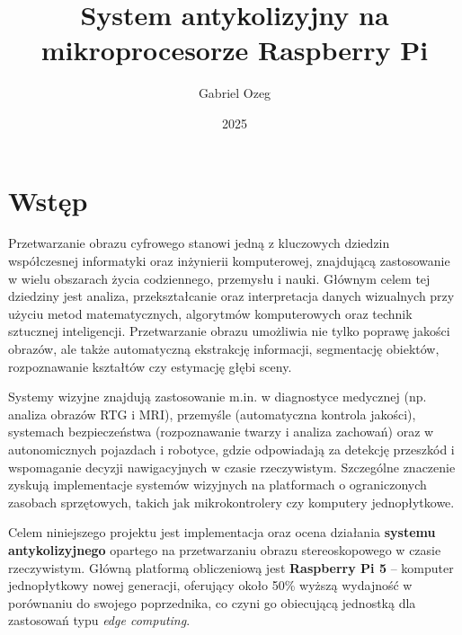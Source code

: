 \documentclass[magisterska]{pracadypl}
\author{Gabriel Ozeg}
\title{System antykolizyjny na mikroprocesorze Raspberry Pi}
\date{2025}
\begin{document}

\maketitle
\tableofcontents
\newpage

\chapter{Wstęp}

Przetwarzanie obrazu cyfrowego stanowi jedną z kluczowych dziedzin współczesnej informatyki oraz inżynierii komputerowej, znajdującą zastosowanie w wielu obszarach życia codziennego, przemysłu i nauki. Głównym celem tej dziedziny jest analiza, przekształcanie oraz interpretacja danych wizualnych przy użyciu metod matematycznych, algorytmów komputerowych oraz technik sztucznej inteligencji. Przetwarzanie obrazu umożliwia nie tylko poprawę jakości obrazów, ale także automatyczną ekstrakcję informacji, segmentację obiektów, rozpoznawanie kształtów czy estymację głębi sceny.

Systemy wizyjne znajdują zastosowanie m.in. w diagnostyce medycznej (np. analiza obrazów RTG i MRI), przemyśle (automatyczna kontrola jakości), systemach bezpieczeństwa (rozpoznawanie twarzy i analiza zachowań) oraz w autonomicznych pojazdach i robotyce, gdzie odpowiadają za detekcję przeszkód i wspomaganie decyzji nawigacyjnych w czasie rzeczywistym. Szczególne znaczenie zyskują implementacje systemów wizyjnych na platformach o ograniczonych zasobach sprzętowych, takich jak mikrokontrolery czy komputery jednopłytkowe.

Celem niniejszego projektu jest implementacja oraz ocena działania \textbf{systemu antykolizyjnego} opartego na przetwarzaniu obrazu stereoskopowego w czasie rzeczywistym. Główną platformą obliczeniową jest \textbf{Raspberry Pi 5} – komputer jednopłytkowy nowej generacji, oferujący około 50\% wyższą wydajność w porównaniu do swojego poprzednika, co czyni go obiecującą jednostką dla zastosowań typu \textit{edge computing}.
\end{document}
